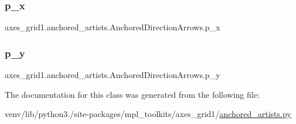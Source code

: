 \subsubsection{\texorpdfstring{p\+\_\+x}{p\_x}}
{\footnotesize\ttfamily axes\+\_\+grid1.\+anchored\+\_\+artists.\+Anchored\+Direction\+Arrows.\+p\+\_\+x}

\mbox{\label{classaxes__grid1_1_1anchored__artists_1_1AnchoredDirectionArrows_a3b7e6e78f527fbff7c24a0a306b6c6af}} 
\subsubsection{\texorpdfstring{p\+\_\+y}{p\_y}}
{\footnotesize\ttfamily axes\+\_\+grid1.\+anchored\+\_\+artists.\+Anchored\+Direction\+Arrows.\+p\+\_\+y}



The documentation for this class was generated from the following file\+:\begin{DoxyCompactItemize}
\item 
venv/lib/python3./site-\/packages/mpl\+\_\+toolkits/axes\+\_\+grid1/\hyperlink{_2anchored__artists_8py}{anchored\+\_\+artists.\+py}\end{DoxyCompactItemize}
